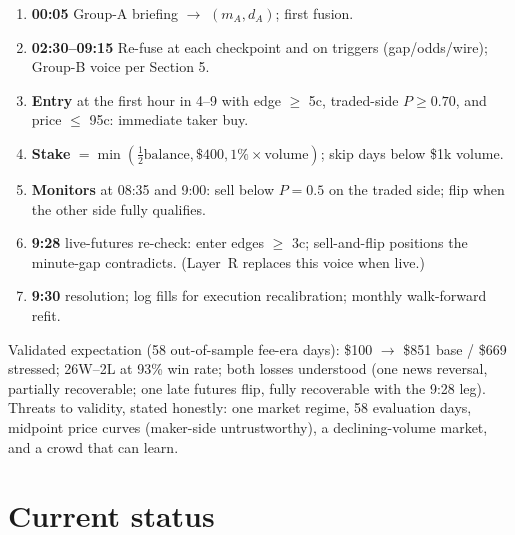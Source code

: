 \documentclass[11pt,a4paper]{article}
\begin{document}
\begin{enumerate}
\item \textbf{00:05} Group-A briefing $\to$ $(m_A, d_A)$; first fusion.
\item \textbf{02:30--09:15} Re-fuse at each checkpoint and on triggers
(gap/odds/wire); Group-B voice per Section 5.
\item \textbf{Entry} at the first hour in 4--9 with edge $\ge$ 5c,
traded-side $P \ge 0.70$, and price $\le$ 95c: immediate taker buy.
\item \textbf{Stake} $= \min(\frac{1}{2}\text{balance}, \$400, 1\%\times
\text{volume})$; skip days below \$1k volume.
\item \textbf{Monitors} at 08:35 and 9:00: sell below $P=0.5$ on the traded
side; flip when the other side fully qualifies.
\item \textbf{9:28} live-futures re-check: enter edges $\ge$ 3c; sell-and-flip
positions the minute-gap contradicts. (Layer~R replaces this voice when live.)
\item \textbf{9:30} resolution; log fills for execution recalibration;
monthly walk-forward refit.
\end{enumerate}

Validated expectation (58 out-of-sample fee-era days): \$100 $\to$ \$851
base / \$669 stressed; 26W--2L at 93\% win rate; both losses understood
(one news reversal, partially recoverable; one late futures flip, fully
recoverable with the 9:28 leg). Threats to validity, stated honestly: one
market regime, 58 evaluation days, midpoint price curves (maker-side
untrustworthy), a declining-volume market, and a crowd that can learn.

\section{Current status}
\end{document}
